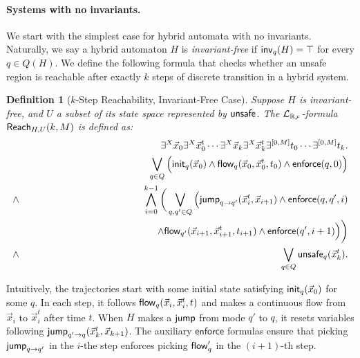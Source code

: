 \documentclass[journal]{IEEEtran}
\newtheorem{definition}{Definition}
\newcommand{\enforce}{\mathsf{enforce}}
\begin{document}
\paragraph{Systems with no invariants.} We start with the simplest case for hybrid automata with no invariants. Naturally, we say a hybrid automaton $H$ is {\em invariant-free} if $\mathsf{inv}_q(H) = \top$ for every $q\in Q(H)$. We define the following formula that checks whether an unsafe region is reachable after exactly $k$ steps of discrete transition in a hybrid system.
\begin{definition}[$k$-Step Reachability, Invariant-Free Case]
Suppose $H$ is invariant-free, and $U$ a subset of its state space represented by $\mathsf{unsafe}$. The $\mathcal{L}_{\mathbb{R}_{\mathcal{F}}}$-formula $\mathsf{Reach}_{H,U}(k,M)$ is defined as:
\begin{eqnarray*}
& &\exists^X \vec x_{0} \exists^X\vec x_{0}^t\cdots \exists^X \vec x_{k}\exists^X\vec x_{k}^t\exists^{[0,M]}t_0\cdots \exists^{[0,M]}t_k.\\
& &\bigvee_{q\in Q} \Big(\init_{q}(\vec x_{0})\wedge \flow_{q}(\vec x_{0}, \vec x_{0}^t, t_0)\wedge \enforce(q,0)\Big)\\%
\wedge & & \bigwedge_{i=0}^{k-1}\bigg( \bigvee_{q, q'\in Q} \Big(\jump_{q\rightarrow q'}(\vec x_{i}^t, \vec x_{i+1})\wedge \enforce(q,q',i)\\
& & \hspace{4.7cm}\wedge\flow_{q'}(\vec x_{i+1}, \vec x_{i+1}^t, t_{i+1})\wedge \enforce(q',i+1)\Big)\bigg)\\
\wedge & & \bigvee_{q\in Q} \unsafe_q(\vec x_{k}^t).
\end{eqnarray*}
\end{definition}
Intuitively, the trajectories start with some initial state satisfying $\mathsf{init}_q(\vec x_{0})$ for some $q$. In each step, it follows $\mathsf{flow}_q(\vec x_{i}, \vec x_{i}^t, t)$ and makes a continuous flow from $\vec x_i$ to $\vec x_i^t$ after time $t$. When $H$ makes a $\mathsf{jump}$ from mode $q'$ to $q$, it resets variables following $\mathsf{jump}_{q'\rightarrow q}(\vec x_{k}^t, \vec x_{k+1})$. The auxiliary $\enforce$ formulas ensure that picking $\mathsf{jump}_{q\rightarrow q'}$ in the $i$-the step enforces picking $\mathsf{flow}_q'$ in the $(i+1)$-th step.
\end{document}
